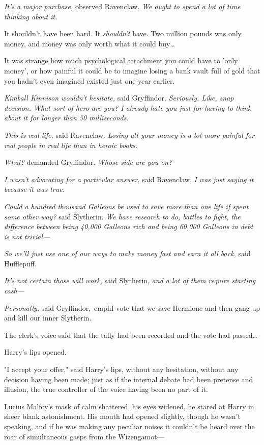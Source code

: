 \emph{It's a major purchase,} observed Ravenclaw. \emph{We ought to spend a lot 
of time thinking about it.}

It shouldn't have been hard. It \emph{shouldn't} have. Two million pounds was 
only money, and money was only worth what it could buy{\ldots}

It was strange how much psychological attachment you could have to 'only 
money', or how painful it could be to imagine losing a bank vault full of gold 
that you hadn't even imagined existed just one year earlier.

\emph{Kimball Kinnison wouldn't hesitate,} said Gryffindor. \emph{Seriously. 
Like, snap decision. What sort of hero are you? I already hate you just for 
having to think about it for longer than 50 milliseconds.}

\emph{This is real life,} said Ravenclaw. \emph{Losing all your money is a lot 
more painful for real people in real life than in heroic books.}

\emph{What?} demanded Gryffindor. \emph{Whose side are you on?}

\emph{I wasn't advocating for a particular answer,} said Ravenclaw, \emph{I was 
just saying it because it was true.}

\emph{Could a hundred thousand Galleons be used to save more than one life if 
spent some other way?} said Slytherin. \emph{We have research to do, battles to 
fight, the difference between being 40,000 Galleons rich and being 60,000 
Galleons in debt is not trivial---}

\emph{So we'll just use one of our ways to make money fast and earn it all 
back,} said Hufflepuff.

\emph{It's not certain those will work,} said Slytherin, \emph{and a lot of 
them require starting cash---}

\emph{Personally,} said Gryffindor,\ emph{I vote that we save Hermione and then 
gang up and kill our inner Slytherin.}

The clerk's voice said that the tally had been recorded and the vote had 
passed{\ldots}

Harry's lips opened.

"I accept your offer," said Harry's lips, without any hesitation, without any 
decision having been made; just as if the internal debate had been pretense and 
illusion, the true controller of the voice having been no part of it.

Lucius Malfoy's mask of calm shattered, his eyes widened, he stared at Harry in 
sheer blank astonishment. His mouth had opened slightly, though he wasn't 
speaking, and if he was making any peculiar noises it couldn't be heard over 
the roar of simultaneous gasps from the Wizengamot---

